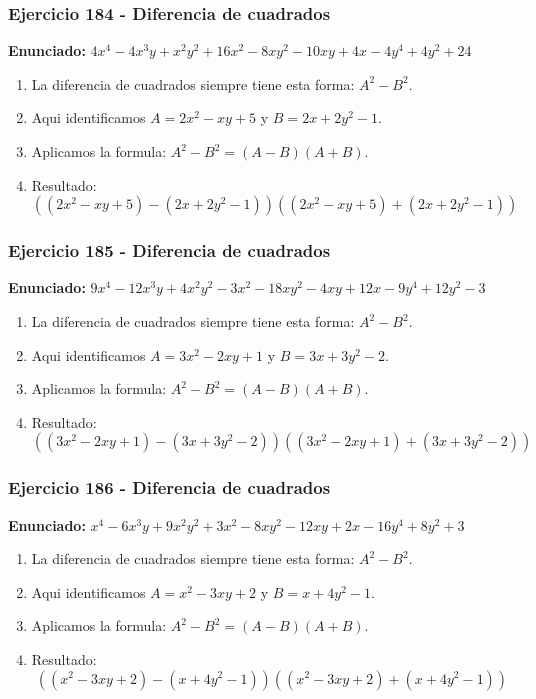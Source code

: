 \documentclass[11pt,a4paper]{article}
\begin{document}
\subsubsection*{Ejercicio 184 - Diferencia de cuadrados}
\textbf{Enunciado:} $ 4 x^{4} - 4 x^{3} y + x^{2} y^{2} + 16 x^{2} - 8 x y^{2} - 10 x y + 4 x - 4 y^{4} + 4 y^{2} + 24 $\par
\begin{enumerate}[leftmargin=2em]
\item La diferencia de cuadrados siempre tiene esta forma: \(A^2-B^2\).
\item Aqui identificamos \(A=2 x^{2} - x y + 5\) y \(B=2 x + 2 y^{2} - 1\).
\item Aplicamos la formula: \(A^2-B^2=(A-B)(A+B)\).
\item Resultado: \[\boxed{\left(\left(2 x^{2} - x y + 5\right)-\left(2 x + 2 y^{2} - 1\right)\right)\left(\left(2 x^{2} - x y + 5\right)+\left(2 x + 2 y^{2} - 1\right)\right)}\]
\end{enumerate}

\vspace{0.2cm}
\subsubsection*{Ejercicio 185 - Diferencia de cuadrados}
\textbf{Enunciado:} $ 9 x^{4} - 12 x^{3} y + 4 x^{2} y^{2} - 3 x^{2} - 18 x y^{2} - 4 x y + 12 x - 9 y^{4} + 12 y^{2} - 3 $\par
\begin{enumerate}[leftmargin=2em]
\item La diferencia de cuadrados siempre tiene esta forma: \(A^2-B^2\).
\item Aqui identificamos \(A=3 x^{2} - 2 x y + 1\) y \(B=3 x + 3 y^{2} - 2\).
\item Aplicamos la formula: \(A^2-B^2=(A-B)(A+B)\).
\item Resultado: \[\boxed{\left(\left(3 x^{2} - 2 x y + 1\right)-\left(3 x + 3 y^{2} - 2\right)\right)\left(\left(3 x^{2} - 2 x y + 1\right)+\left(3 x + 3 y^{2} - 2\right)\right)}\]
\end{enumerate}

\vspace{0.2cm}
\subsubsection*{Ejercicio 186 - Diferencia de cuadrados}
\textbf{Enunciado:} $ x^{4} - 6 x^{3} y + 9 x^{2} y^{2} + 3 x^{2} - 8 x y^{2} - 12 x y + 2 x - 16 y^{4} + 8 y^{2} + 3 $\par
\begin{enumerate}[leftmargin=2em]
\item La diferencia de cuadrados siempre tiene esta forma: \(A^2-B^2\).
\item Aqui identificamos \(A=x^{2} - 3 x y + 2\) y \(B=x + 4 y^{2} - 1\).
\item Aplicamos la formula: \(A^2-B^2=(A-B)(A+B)\).
\item Resultado: \[\boxed{\left(\left(x^{2} - 3 x y + 2\right)-\left(x + 4 y^{2} - 1\right)\right)\left(\left(x^{2} - 3 x y + 2\right)+\left(x + 4 y^{2} - 1\right)\right)}\]
\end{enumerate}
\end{document}
